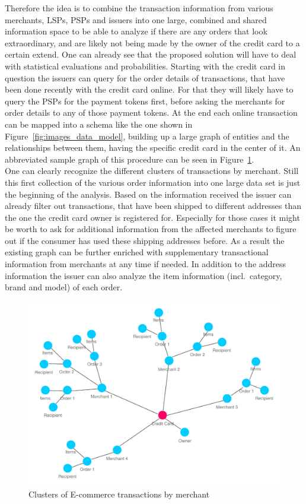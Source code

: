 Therefore the idea is to combine the transaction information from various merchants, \gls{LSP}s, \gls{PSP}s and issuers into one large, combined and shared information space to be able to analyze if there are any orders that look extraordinary, and are likely not being made by the owner of the credit card to a certain extend. One can already see that the proposed solution will have to deal with statistical evaluations and probabilities. Starting with the credit card in question the issuers can query for the order details of transactions, that have been done recently with the credit card online. For that they will likely have to query the \gls{PSP}s for the payment tokens first, before asking the merchants for order details to any of those payment tokens. At the end each online transaction can be mapped into a schema like the one shown in Figure~\ref{fig:images_data_model}, building up a large graph of entities and  the relationships between them, having the specific credit card in the center of it. An abbreviated sample graph of this procedure can be seen in Figure~\ref{fig:images_credit_card_graph}. \\

One can clearly recognize the different clusters of transactions by merchant. Still this first collection of the various order information into one large data set is just the beginning of the analysis. Based on the information received the issuer can already filter out transactions, that have been shipped to different addresses than the one the credit card owner is registered for. Especially for those cases it might be worth to ask for additional information from the affected merchants to figure out if the consumer has used these shipping addresses before. As a result the existing graph can be further enriched with supplementary transactional information from merchants at any time if needed. In addition to the address information the issuer can also analyze the item information (incl.\ category, brand and model) of each order. \\

\begin{figure}[!ht]
  \centering
  \includegraphics[width=0.9\columnwidth]{images/ontology_scenario_2.pdf}
  \caption{Clusters of E-commerce transactions by merchant}
\label{fig:images_credit_card_graph}
\end{figure}


